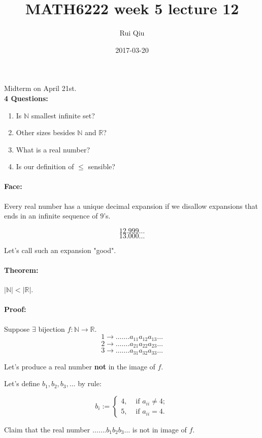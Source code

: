 \documentclass[a4paper, 11pt, twoside]{article}
\begin{document}
\title{MATH6222 week 5 lecture 12}
\author{Rui Qiu}
\date{2017-03-20}

\maketitle

Midterm on April 21st.\\

\textbf{4 Questions:}
\begin{enumerate}
	\item Is $\mathbb{N}$ smallest infinite set?
	\item Other sizes besides $\mathbb{N}$ and $\mathbb{R}$?
	\item What is a real number?
	\item Is our definition of $\leq$ sensible?
\end{enumerate}

\paragraph{Face:} Every real number has a unique decimal expansion if we disallow expansions that ends in an infinite sequence of $9$'s.

\[12.999\dots\]
\[13.000\dots\]

Let's call such an expansion "good".\\

\paragraph{Theorem:} $|\mathbb{N}| < |\mathbb{R}|$.

\paragraph{Proof:} Suppose $\exists$ bijection $f:\mathbb{N}\to\mathbb{R}$.
\[1\to \dots\dots . a_{11}a_{12}a_{13}\dots\]
\[2\to \dots\dots . a_{21}a_{22}a_{23}\dots\]
\[3\to \dots\dots . a_{31}a_{32}a_{33}\dots\]

Let's produce a real number \textbf{not} in the image of $f$.

Let's define $b_1, b_2, b_3, \dots$ by rule:

\[b_i:=\begin{cases}
	4, &\text{ if } a_{ii}\not=4;\\
	5, &\text{ if } a_{ii}=4.
\end{cases}
\]

Claim that the real number $\dots\dots. b_1b_2b_3\dots$ is not in image of $f$.
\end{document}
